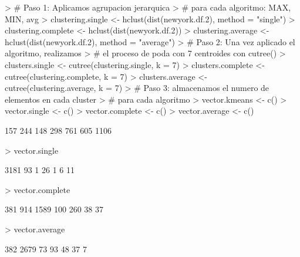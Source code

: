 \documentclass [a4paper] {article}
\begin{document}
\begin{Schunk}
\begin{Sinput}
> # Paso 1: Aplicamos agrupacion jerarquica
> # para cada algoritmo: MAX, MIN, avg
> clustering.single <- hclust(dist(newyork.df.2), method = "single")
> clustering.complete <- hclust(dist(newyork.df.2))
> clustering.average <- hclust(dist(newyork.df.2), method = "average")
> # Paso 2: Una vez aplicado el algoritmo, realizamos
> # el proceso de poda con 7 centroides con cutree()
> clusters.single <- cutree(clustering.single, k = 7)
> clusters.complete <- cutree(clustering.complete, k = 7)
> clusters.average <- cutree(clustering.average, k = 7)
> # Paso 3: almacenamos el numero de elementos en cada cluster
> # para cada algoritmo
> vector.kmeans <- c()
> vector.single <- c()
> vector.complete <- c()
> vector.average <- c()
\end{Sinput}
\end{Schunk}
\newpage
\begin{Schunk}
\begin{Soutput}
[1]  157  244  148  298  761  605 1106
\end{Soutput}
\begin{Sinput}
> vector.single
\end{Sinput}
\begin{Soutput}
[1] 3181   93    1   26    1    6   11
\end{Soutput}
\begin{Sinput}
> vector.complete
\end{Sinput}
\begin{Soutput}
[1]  381  914 1589  100  260   38   37
\end{Soutput}
\begin{Sinput}
> vector.average
\end{Sinput}
\begin{Soutput}
[1]  382 2679   73   93   48   37    7
\end{Soutput}
\end{Schunk}
\end{document}
